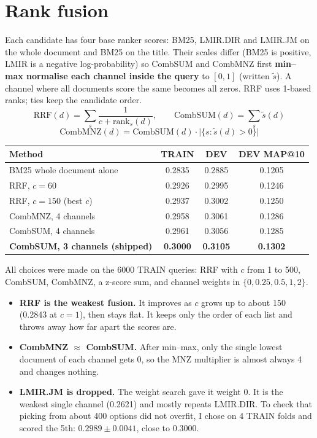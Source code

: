 \documentclass[10pt,a4paper]{article}
\begin{document}
\section{Rank fusion}
\begin{minipage}[t]{0.51\textwidth}
\vspace{0pt}
Each candidate has four base ranker scores: BM25, LMIR.DIR and LMIR.JM on the whole document and BM25 on the title. Their scales differ (BM25 is positive, LMIR is a negative log-probability) so CombSUM and CombMNZ first \textbf{min--max normalise each channel inside the query} to $[0,1]$ (written $\tilde s$). A channel where all documents score the same becomes all zeros. RRF uses 1-based ranks; ties keep the candidate order.
\vspace{-3pt}
\[
\mathrm{RRF}(d)=\sum_s\frac{1}{c+\mathrm{rank}_s(d)},\qquad
\mathrm{CombSUM}(d)=\sum_s\tilde s(d)
\]
\vspace{-12pt}
\[
\mathrm{CombMNZ}(d)=\mathrm{CombSUM}(d)\cdot\bigl|\{s:\tilde s(d)>0\}\bigr|
\]
\end{minipage}\hfill
\begin{minipage}[t]{0.465\textwidth}
\vspace{0pt}
\centering\footnotesize
\begin{tabular}{@{}lccc@{}}
\toprule
Method & TRAIN & DEV & DEV MAP@10\\
\midrule
BM25 whole document alone & 0.2835 & 0.2885 & 0.1205\\
RRF, $c=60$ & 0.2926 & 0.2995 & 0.1246\\
RRF, $c=150$ (best $c$) & 0.2937 & 0.3002 & 0.1250\\
CombMNZ, 4 channels & 0.2958 & 0.3061 & 0.1286\\
CombSUM, 4 channels & 0.2961 & 0.3056 & 0.1285\\
\textbf{CombSUM, 3 channels (shipped)} & \textbf{0.3000} & \textbf{0.3105} & \textbf{0.1302}\\
\bottomrule
\end{tabular}
\end{minipage}

\vspace{1pt}
All choices were made on the 6000 TRAIN queries: RRF with $c$ from 1 to 500, CombSUM, CombMNZ, a z-score sum, and channel weights in $\{0,0.25,0.5,1,2\}$.
\begin{itemize}
\item \textbf{RRF is the weakest fusion.} It improves as $c$ grows up to about 150 (0.2843 at $c=1$), then stays flat. It keeps only the order of each list and throws away how far apart the scores are.
\item \textbf{CombMNZ $\approx$ CombSUM.} After min--max, only the single lowest document of each channel gets 0, so the MNZ multiplier is almost always 4 and changes nothing.
\item \textbf{LMIR.JM is dropped.} The weight search gave it weight 0. It is the weakest single channel (0.2621) and mostly repeats LMIR.DIR. To check that picking from about 400 options did not overfit, I chose on 4 TRAIN folds and scored the 5th: $0.2989\pm0.0041$, close to 0.3000.
\end{itemize}
\end{document}
